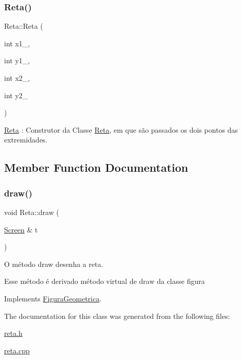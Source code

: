 \subsubsection{\texorpdfstring{Reta()}{Reta()}}
{\footnotesize\ttfamily Reta\+::\+Reta (\begin{DoxyParamCaption}\item[{int}]{x1\+\_\+,  }\item[{int}]{y1\+\_\+,  }\item[{int}]{x2\+\_\+,  }\item[{int}]{y2\+\_\+ }\end{DoxyParamCaption})}



\hyperlink{class_reta}{Reta} \+: Construtor da Classe \hyperlink{class_reta}{Reta}, em que são passados os dois pontos das extremidades. 



\subsection{Member Function Documentation}
\mbox{\label{class_reta_ac2e9805183cd474b62bffd8b032cd780}} 
\subsubsection{\texorpdfstring{draw()}{draw()}}
{\footnotesize\ttfamily void Reta\+::draw (\begin{DoxyParamCaption}\item[{\hyperlink{class_screen}{Screen} \&}]{t }\end{DoxyParamCaption})\hspace{0.3cm}{\ttfamily [virtual]}}



O método draw desenha a reta. 

Esse método é derivado método virtual de draw da classe figura 

Implements \hyperlink{class_figura_geometrica_a8ee8dedc060b6059a805ea091aef2c41}{Figura\+Geometrica}.



The documentation for this class was generated from the following files\+:\begin{DoxyCompactItemize}
\item 
\hyperlink{reta_8h}{reta.\+h}\item 
\hyperlink{reta_8cpp}{reta.\+cpp}\end{DoxyCompactItemize}
